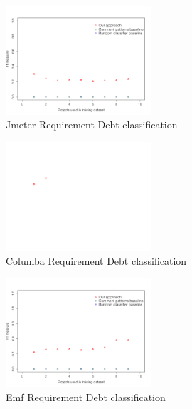 \begin{figure}[thb!]
  \centering
  \includegraphics[width=0.48\textwidth]{figures/appendix/iteration_details/implementation_jmeter.pdf}
  \vspace{-3mm}
  \caption{Jmeter Requirement Debt classification}
  \label{fig:implementation_jmeter}
\end{figure}

\begin{figure}[thb!]
  \centering
  \includegraphics[width=0.48\textwidth]{figures/appendix/iteration_details/implementation_columba.pdf}
  \vspace{-3mm}
  \caption{Columba Requirement Debt classification}
  \label{fig:implementation_columba}
\end{figure}

\begin{figure}[thb!]
  \centering
  \includegraphics[width=0.48\textwidth]{figures/appendix/iteration_details/implementation_emf.pdf}
  \vspace{-3mm}
  \caption{Emf Requirement Debt classification}
  \label{fig:implementation_emf}
\end{figure}

